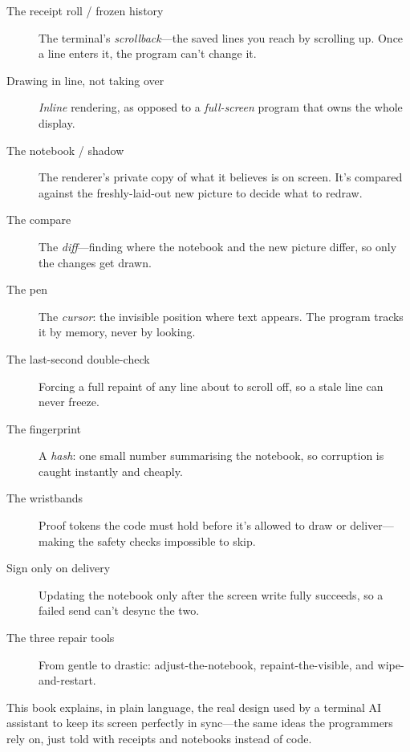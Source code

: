 \documentclass[11pt,twoside]{book}
\begin{document}
\begin{description}
\item[The receipt roll / frozen history] The terminal's \emph{scrollback}---the
  saved lines you reach by scrolling up. Once a line enters it, the program
  can't change it.
\item[Drawing in line, not taking over] \emph{Inline} rendering, as opposed to
  a \emph{full-screen} program that owns the whole display.
\item[The notebook / shadow] The renderer's private copy of what it believes is
  on screen. It's compared against the freshly-laid-out new picture to decide
  what to redraw.
\item[The compare] The \emph{diff}---finding where the notebook and the new
  picture differ, so only the changes get drawn.
\item[The pen] The \emph{cursor}: the invisible position where text appears.
  The program tracks it by memory, never by looking.
\item[The last-second double-check] Forcing a full repaint of any line about to
  scroll off, so a stale line can never freeze.
\item[The fingerprint] A \emph{hash}: one small number summarising the notebook,
  so corruption is caught instantly and cheaply.
\item[The wristbands] Proof tokens the code must hold before it's allowed to
  draw or deliver---making the safety checks impossible to skip.
\item[Sign only on delivery] Updating the notebook only after the screen write
  fully succeeds, so a failed send can't desync the two.
\item[The three repair tools] From gentle to drastic: adjust-the-notebook,
  repaint-the-visible, and wipe-and-restart.
\end{description}

\vspace{6pt}
\noindent This book explains, in plain language, the real design used by a
terminal AI assistant to keep its screen perfectly in sync---the same ideas the
programmers rely on, just told with receipts and notebooks instead of code.
\end{document}
